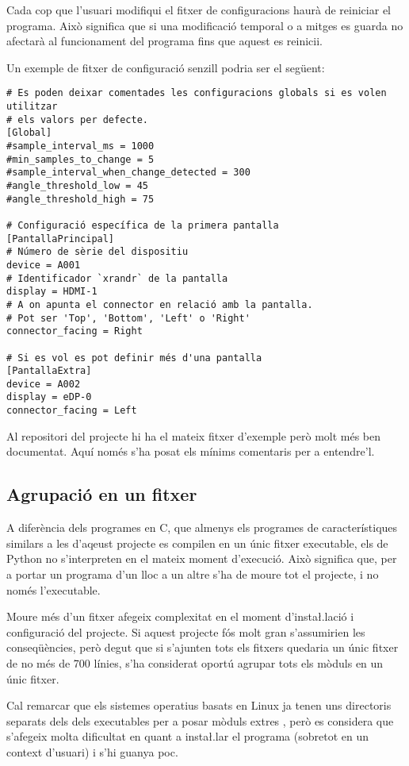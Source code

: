 Cada cop que l'usuari modifiqui el fitxer de configuracions haurà de reiniciar
el programa. Això significa que si una modificació temporal o a mitges es guarda
no afectarà al funcionament del programa fins que aquest es reinicii.

Un exemple de fitxer de configuració senzill podria ser el següent:

\begin{verbatim}
# Es poden deixar comentades les configuracions globals si es volen utilitzar
# els valors per defecte.
[Global]
#sample_interval_ms = 1000
#min_samples_to_change = 5
#sample_interval_when_change_detected = 300
#angle_threshold_low = 45
#angle_threshold_high = 75

# Configuració específica de la primera pantalla
[PantallaPrincipal]
# Número de sèrie del dispositiu
device = A001
# Identificador `xrandr` de la pantalla
display = HDMI-1
# A on apunta el connector en relació amb la pantalla.
# Pot ser 'Top', 'Bottom', 'Left' o 'Right'
connector_facing = Right

# Si es vol es pot definir més d'una pantalla
[PantallaExtra]
device = A002
display = eDP-0
connector_facing = Left
\end{verbatim}

Al repositori del projecte hi ha el mateix fitxer d'exemple però molt més ben
documentat. Aquí només s'ha posat els mínims comentaris per a entendre'l.

\subsection{Agrupació en un fitxer}

A diferència dels programes en C, que almenys els programes de característiques
similars a les d'aqeust projecte es compilen en un únic fitxer executable, els
 de Python no s'interpreten en el mateix moment d'execució. Això
significa que, per a portar un programa d'un lloc a un altre s'ha de moure tot
el projecte, i no només l'executable.

Moure més d'un fitxer afegeix complexitat en el moment d'insta\l.lació i
configuració del projecte. Si aquest projecte fós molt gran s'assumirien les
conseqüències, però degut que si s'ajunten tots els fitxers quedaria un únic
fitxer de no més de 700 línies, s'ha considerat oportú agrupar tots els mòduls
en un únic fitxer.

Cal remarcar que els sistemes operatius basats en Linux ja tenen uns directoris
separats dels dels executables per a posar mòduls extres \cite{InstallPython3},
però es considera que
s'afegeix molta dificultat en quant a insta\l.lar el programa (sobretot en un
context d'usuari) i s'hi guanya poc.

